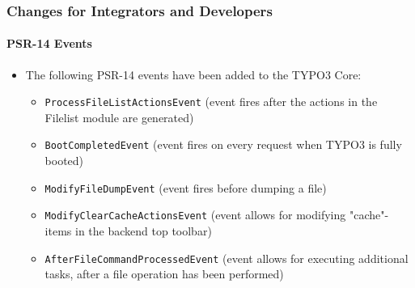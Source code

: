 %

\begin{frame}[fragile]
	\frametitle{Changes for Integrators and Developers}
	\framesubtitle{PSR-14 Events}


	\begin{itemize}
		\item The following PSR-14 events have been added to the TYPO3 Core:
			\begin{itemize}
				\item \texttt{ProcessFileListActionsEvent}\newline
					(event fires after the actions in the Filelist module are generated)
				\vspace{0.1cm}
				\item \texttt{BootCompletedEvent}\newline
					(event fires on every request when TYPO3 is fully booted)
				\vspace{0.1cm}
				\item \texttt{ModifyFileDumpEvent}\newline
					(event fires before dumping a file)
				\vspace{0.1cm}
				\item \texttt{ModifyClearCacheActionsEvent}\newline
					(event allows for modifying "cache"-items in the backend top toolbar)
				\vspace{0.1cm}
				\item \texttt{AfterFileCommandProcessedEvent}\newline
					(event allows for executing additional tasks, after a file operation has been performed)
			\end{itemize}
	\end{itemize}
\end{frame}

